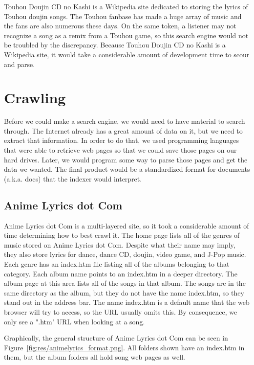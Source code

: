\documentclass{acm} %
\begin{document}
\begin{CJK}{UTF8}{zhsong}
Touhou Doujin CD no Kashi is a Wikipedia site dedicated to storing the lyrics of Touhou doujin songs. The Touhou fanbase has made a huge array of music and the fans are also numerous these days. On the same token, a listener may not recognize a song as a remix from a Touhou game, so this search engine would not be troubled by the discrepancy. Because Touhou Doujin CD no Kashi is a Wikipedia site, it would take a considerable amount of development time to scour and parse.


\section{Crawling}

Before we could make a search engine, we would need to have material to search through. The Internet already has a great amount of data on it, but we need to extract that information. In order to do that, we used programming languages that were able to retrieve web pages so that we could save those pages on our hard drives. Later, we would program some way to parse those pages and get the data we wanted. The final product would be a standardized format for documents (a.k.a. docs) that the indexer would interpret.

\subsection{Anime Lyrics dot Com}

Anime Lyrics dot Com is a multi-layered site, so it took a considerable amount of time determining how to best crawl it. The home page lists all of the genres of music stored on Anime Lyrics dot Com. Despite what their name may imply, they also store lyrics for dance, dance CD, doujin, video game, and J-Pop music. Each genre has an index.htm file listing all of the albums belonging to that category. Each album name points to an index.htm in a deeper directory. The album page at this area lists all of the songs in that album. The songs are in the same directory as the album, but they do not have the name index.htm, so they stand out in the address bar. The name index.htm is a default name that the web browser will try to access, so the URL usually omits this. By consequence, we only see a ".htm" URL when looking at a song.

Graphically, the general structure of Anime Lyrics dot Com can be seen in Figure~\ref{fig:res/animelyrics_format.png}. All folders shown have an index.htm in them, but the album folders all hold song web pages as well.


\end{CJK}
\end{document}
